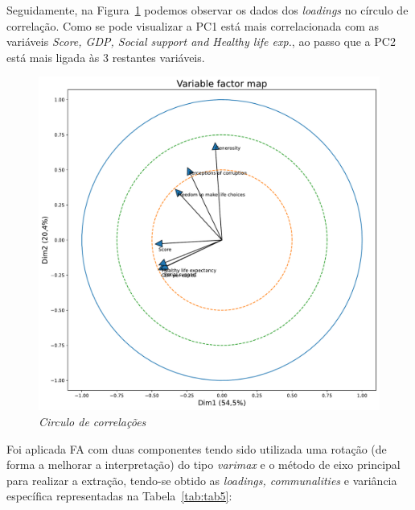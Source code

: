 \documentclass[12pt, a4paper]{article}
\begin{document}
Seguidamente, na Figura~\ref{fig:fig8} podemos observar os dados dos \emph{loadings} no círculo de
correlação. Como se pode visualizar a PC1 está mais correlacionada com
as variáveis \emph{Score, GDP, Social support and Healthy life exp.}, ao
passo que a PC2 está mais ligada às 3 restantes
variáveis.

\begin{figure}[h]
\includegraphics[scale=0.40]{VariableFactorMap1.pdf}
\centering
\caption{\emph{Circulo de correlações}}
\label{fig:fig8}
\end{figure}

Foi aplicada FA com duas
componentes tendo sido utilizada uma rotação (de forma a melhorar a
interpretação) do tipo \emph{varimax} e o método de eixo principal para
realizar a extração, tendo-se obtido as \emph{loadings, communalities} e
variância específica representadas na Tabela~\ref{tab:tab5}:
\end{document}
